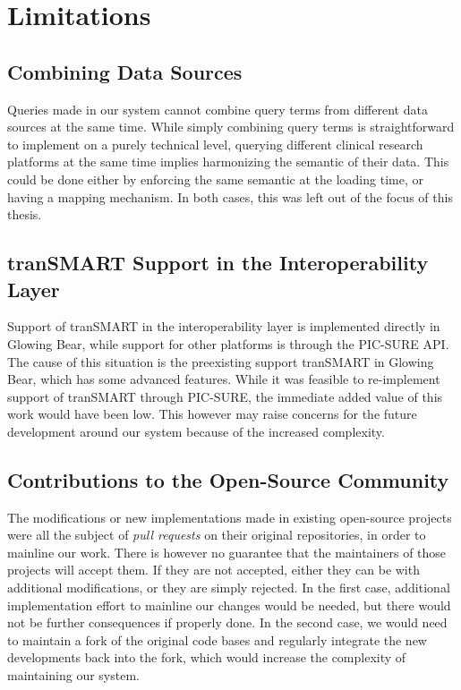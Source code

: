 \section{Limitations}

\subsection{Combining Data Sources}
Queries made in our system cannot combine query terms from different data sources at the same time.
While simply combining query terms is straightforward to implement on a purely technical level, querying different clinical research platforms at the same time implies harmonizing the semantic of their data.
This could be done either by enforcing the same semantic at the loading time, or having a mapping mechanism.
In both cases, this was left out of the focus of this thesis.

\subsection{tranSMART Support in the Interoperability Layer}
Support of tranSMART in the interoperability layer is implemented directly in Glowing Bear, while support for other platforms is through the PIC-SURE API.
The cause of this situation is the preexisting support tranSMART in Glowing Bear, which has some advanced features.
While it was feasible to re-implement support of tranSMART through PIC-SURE, the immediate added value of this work would have been low.
This however may raise concerns for the future development around our system because of the increased complexity.

\subsection{Contributions to the Open-Source Community}
The modifications or new implementations made in existing open-source projects were all the subject of \emph{pull requests} on their original repositories, in order to mainline our work.
There is however no guarantee that the maintainers of those projects will accept them.
If they are not accepted, either they can be with additional modifications, or they are simply rejected.
In the first case, additional implementation effort to mainline our changes would be needed, but there would not be further consequences if properly done.
In the second case, we would need to maintain a fork of the original code bases and regularly integrate the new developments back into the fork, which would increase the complexity of maintaining our system.

